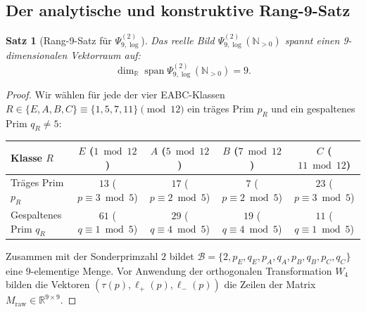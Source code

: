 \documentclass[11pt,a4paper]{article}
\theoremstyle{plain}
\newtheorem{theorem}{Satz}[section]
\theoremstyle{definition}
\newcommand{\N}{\mathbb{N}}
\newcommand{\R}{\mathbb{R}}
\begin{document}
\subsection{Der analytische und konstruktive Rang-9-Satz}

\begin{theorem}[Rang-9-Satz für $\Psi_{9,\log}^{(2)}$]
\label{thm:rank9}
Das reelle Bild $\Psi_{9,\log}^{(2)}(\N_{>0})$ spannt einen 9-dimensionalen Vektorraum auf:
\begin{equation}
    \dim_\R \operatorname{span} \Psi_{9,\log}^{(2)}(\N_{>0}) = 9.
\end{equation}
\end{theorem}

\begin{proof}
Wir wählen für jede der vier EABC-Klassen $R \in \{E, A, B, C\} \equiv \{1, 5, 7, 11\} \pmod{12}$ ein träges Prim $p_R$ und ein gespaltenes Prim $q_R \neq 5$:
\begin{center}
\begin{tabular}{lcccc}
\toprule
Klasse $R$ & $E$ ($1 \bmod 12$) & $A$ ($5 \bmod 12$) & $B$ ($7 \bmod 12$) & $C$ ($11 \bmod 12$) \\
\midrule
Träges Prim $p_R$ & $13$ ($p \equiv 3 \bmod 5$) & $17$ ($p \equiv 2 \bmod 5$) & $7$ ($p \equiv 2 \bmod 5$) & $23$ ($p \equiv 3 \bmod 5$) \\
Gespaltenes Prim $q_R$ & $61$ ($q \equiv 1 \bmod 5$) & $29$ ($q \equiv 4 \bmod 5$) & $19$ ($q \equiv 4 \bmod 5$) & $11$ ($q \equiv 1 \bmod 5$) \\
\bottomrule
\end{tabular}
\end{center}
Zusammen mit der Sonderprimzahl $2$ bildet $\mathcal{B} = \{2, p_E, q_E, p_A, q_A, p_B, q_B, p_C, q_C\}$ eine 9-elementige Menge. Vor Anwendung der orthogonalen Transformation $W_4$ bilden die Vektoren $(\tau(p), \boldsymbol{\ell}_+(p), \boldsymbol{\ell}_-(p))$ die Zeilen der Matrix $M_{\mathrm{raw}} \in \R^{9 \times 9}$.


\end{proof}
\end{document}
